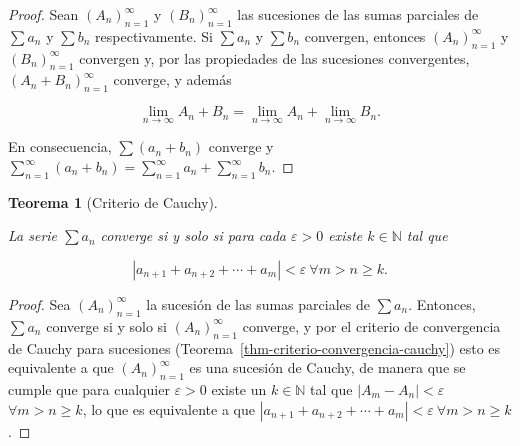 \documentclass[
  a4paper,
]{scrreport}
\theoremstyle{definition}
\theoremstyle{plain}
\theoremstyle{definition}
\theoremstyle{definition}
\theoremstyle{plain}
\newtheorem{theorem}{Teorema}[chapter]
\theoremstyle{plain}
\theoremstyle{remark}
\begin{document}
\begin{tcolorbox}[enhanced jigsaw, leftrule=.75mm, colbacktitle=quarto-callout-note-color!10!white, toprule=.15mm, opacityback=0, opacitybacktitle=0.6, toptitle=1mm, breakable, bottomtitle=1mm, colframe=quarto-callout-note-color-frame, rightrule=.15mm, titlerule=0mm, title=\textcolor{quarto-callout-note-color}{\faInfo}\hspace{0.5em}{Demostración}, arc=.35mm, left=2mm, bottomrule=.15mm, colback=white, coltitle=black]

\begin{proof}
Sean \((A_n)_{n=1}^\infty\) y \((B_n)_{n=1}^\infty\) las sucesiones de
las sumas parciales de \(\sum a_n\) y \(\sum b_n\) respectivamente. Si
\(\sum a_n\) y \(\sum b_n\) convergen, entonces \((A_n)_{n=1}^\infty\) y
\((B_n)_{n=1}^\infty\) convergen y, por las propiedades de las
sucesiones convergentes, \((A_n+B_n)_{n=1}^\infty\) converge, y además

\[
\lim_{n\to\infty} A_n+B_n = \lim_{n\to\infty}A_n+\lim_{n\to\infty}B_n.
\]

En consecuencia, \(\sum (a_n+b_n)\) converge y
\(\sum_{n=1}^\infty (a_n+b_n) = \sum_{n=1}^\infty a_n+\sum_{n=1}^\infty b_n\).
\end{proof}

\end{tcolorbox}

\begin{theorem}[Criterio de
Cauchy]\protect\hypertarget{thm-criterio-cauchy-series}{}\label{thm-criterio-cauchy-series}

La serie \(\sum a_n\) converge si y solo si para cada \(\varepsilon>0\)
existe \(k\in\mathbb{N}\) tal que

\[
|a_{n+1}+a_{n+2}+\cdots+a_m|<\varepsilon\ \forall m>n\geq k.
\]

\end{theorem}

\begin{tcolorbox}[enhanced jigsaw, leftrule=.75mm, colbacktitle=quarto-callout-note-color!10!white, toprule=.15mm, opacityback=0, opacitybacktitle=0.6, toptitle=1mm, breakable, bottomtitle=1mm, colframe=quarto-callout-note-color-frame, rightrule=.15mm, titlerule=0mm, title=\textcolor{quarto-callout-note-color}{\faInfo}\hspace{0.5em}{Demostración}, arc=.35mm, left=2mm, bottomrule=.15mm, colback=white, coltitle=black]

\begin{proof}
Sea \((A_n)_{n=1}^\infty\) la sucesión de las sumas parciales de
\(\sum a_n\). Entonces, \(\sum a_n\) converge si y solo si
\((A_n)_{n=1}^\infty\) converge, y por el criterio de convergencia de
Cauchy para sucesiones (Teorema~\ref{thm-criterio-convergencia-cauchy})
esto es equivalente a que \((A_n)_{n=1}^\infty\) es una sucesión de
Cauchy, de manera que se cumple que para cualquier \(\varepsilon>0\)
existe un \(k\in\mathbb{N}\) tal que \(|A_m-A_n|<\varepsilon\)
\(\forall m>n\geq k\), lo que es equivalente a que
\(|a_{n+1}+a_{n+2}+\cdots+a_m|<\varepsilon\ \forall m>n\geq k\).
\end{proof}

\end{tcolorbox}
\end{document}
